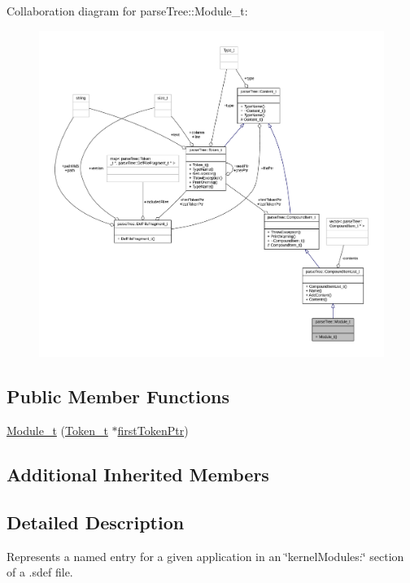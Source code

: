 Collaboration diagram for parse\+Tree\+:\+:Module\+\_\+t\+:
\nopagebreak
\begin{figure}[H]
\begin{center}
\leavevmode
\includegraphics[width=350pt]{structparse_tree_1_1_module__t__coll__graph}
\end{center}
\end{figure}
\subsection*{Public Member Functions}
\begin{DoxyCompactItemize}
\item 
\hyperlink{structparse_tree_1_1_module__t_a131c3e07242362faf5f595ae6651befb}{Module\+\_\+t} (\hyperlink{structparse_tree_1_1_token__t}{Token\+\_\+t} $\ast$\hyperlink{structparse_tree_1_1_compound_item__t_a587020c943e760cb0152dd8cd31e21ef}{first\+Token\+Ptr})
\end{DoxyCompactItemize}
\subsection*{Additional Inherited Members}


\subsection{Detailed Description}
Represents a named entry for a given application in an \char`\"{}kernel\+Modules\+:\char`\"{} section of a .sdef file. 

